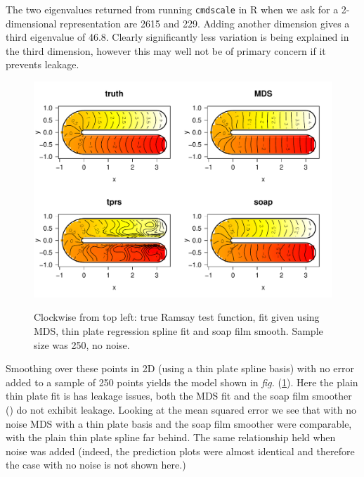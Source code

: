 \documentclass[a4paper,10pt]{article}
\newcommand{\fig}[1]{\emph{fig.} (\ref{#1})}
\begin{document}

The two eigenvalues returned from running \texttt{cmdscale} in \textsf{R} when we ask for a 2-dimensional representation are 2615 and 229. Adding another dimension gives a third eigenvalue of 46.8. Clearly significantly less variation is being explained in the third dimension, however this may well not be of primary concern if it prevents leakage.

\begin{figure}
\centering
\includegraphics[width=5.5in]{figs/ramsay-mds-smooth-noerr.pdf} \\
\caption{Clockwise from top left: true Ramsay test function, fit given using MDS, thin plate regression spline fit and soap film smooth. Sample size was 250, no noise.}
\label{ramsay-mds-smooth-noerr}
\end{figure}

Smoothing over these points in 2D (using a thin plate spline basis) with no error added to a sample of 250 points yields the model shown in \fig{ramsay-mds-smooth-noerr}. Here the plain thin plate fit is has leakage issues, both the MDS fit and the soap film smoother (\cite{soap}) do not exhibit leakage. Looking at the mean squared error we see that with no noise MDS with a thin plate basis and the soap film smoother were comparable, with the plain thin plate spline far behind. The same relationship held when noise was added (indeed, the prediction plots were almost identical and therefore the case with no noise is not shown here.)
\end{document}
